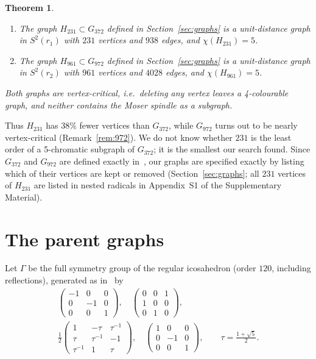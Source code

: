 \documentclass[11pt]{article}
\renewcommand{\_}{\textunderscore\allowbreak}
\newtheorem{theorem}{Theorem}
\theoremstyle{remark}
\begin{document}
\begin{theorem}\label{thm:main}
\begin{enumerate}
  \item[(a)] The graph $H_{231}\subset G_{372}$ defined in Section~\ref{sec:graphs} is a unit-distance
  graph in $S^2(r_1)$ with $231$ vertices and $938$ edges, and $\chi(H_{231})=5$.
  \item[(b)] The graph $H_{961}\subset G_{972}$ defined in Section~\ref{sec:graphs} is a unit-distance
  graph in $S^2(r_2)$ with $961$ vertices and $4028$ edges, and $\chi(H_{961})=5$.
\end{enumerate}
Both graphs are vertex-critical, i.e.\ deleting any vertex leaves a 4-colourable graph, and neither
contains the Moser spindle as a subgraph.
\end{theorem}

Thus $H_{231}$ has $38\%$ fewer vertices than $G_{372}$, while $G_{972}$ turns out to be nearly
vertex-critical (Remark~\ref{rem:972}). We do not know whether $231$ is the least order of a 5-chromatic
subgraph of $G_{372}$; it is the smallest our search found. Since $G_{372}$ and $G_{972}$ are defined exactly
in~\cite{VND2022}, our graphs are specified exactly by listing which of their vertices are kept or
removed (Section~\ref{sec:graphs}; all $231$ vertices of $H_{231}$ are listed in nested radicals in Appendix~S1 of the Supplementary Material).

\section{The parent graphs}\label{sec:parents}

Let $\Gamma$ be the full symmetry group of the regular icosahedron (order $120$, including reflections),
generated as in~\cite{VNDrepo} by
\begin{gather*}
\begin{pmatrix}-1&0&0\\0&-1&0\\0&0&1\end{pmatrix},\quad
\begin{pmatrix}0&0&1\\1&0&0\\0&1&0\end{pmatrix},\\
\frac12\begin{pmatrix}1&-\tau&\tau^{-1}\\ \tau&\tau^{-1}&-1\\ \tau^{-1}&1&\tau\end{pmatrix},\quad
\begin{pmatrix}1&0&0\\0&-1&0\\0&0&1\end{pmatrix},
\qquad \tau=\tfrac{1+\sqrt5}{2}.
\end{gather*}
\end{document}
